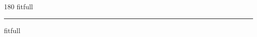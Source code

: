 
\begin{frame}
\begin{center}
\begin{turn}{180}
{\fontsize{2.5cm}{1em}\selectfont fitfull}
\end{turn}
\vspace{1em}\par  
\hrule
\vspace{1em}\par  
{\fontsize{2.5cm}{1em}\selectfont fitfull}
\end{center}
\end{frame}
